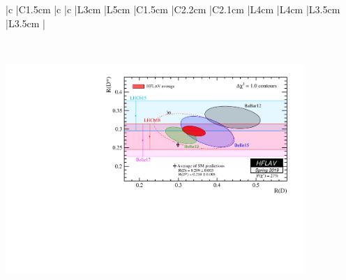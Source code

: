 \documentclass[10pt, landscape]{article}
\begin{document}
    
        \begin{tabular}{
                |c %
                |C{1.5cm} %
                |c %
                |c %
                |L{3cm} %
                |L{5cm} %
                |C{1.5cm} %
                |C{2.2cm} %
                |C{2.1cm} %
                |L{4cm} %
                |L{4cm} %
                |L{3.5cm} %
                |L{3.5cm} %
                |
                }
            \hline\hline
            
            \\\hline\hline
        \end{tabular}
    
    \includegraphics[height=8cm]{fig/hflav.pdf}
    
\end{document}
